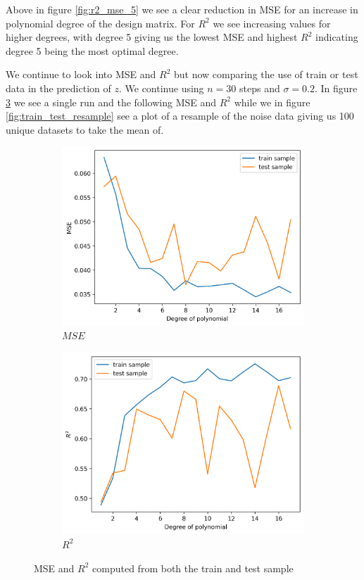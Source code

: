 \documentclass[12pt]{article}
\begin{document}
Above in figure \ref{fig:r2_mse_5} we see a clear reduction in MSE for an increase in polynomial degree of the design matrix. For $R^2$ we see increasing values for higher degrees, with degree 5 giving us the lowest MSE and highest $R^2$ indicating degree 5 being the most optimal degree.

We continue to look into MSE and $R^2$ but now comparing the use of train or test data in the prediction of $z$. We continue using $n=30$ steps and $\sigma=0.2$. In figure \ref{fig:train_test} we see a single run and the following MSE and $R^2$ while we in figure \ref{fig:train_test_resample} see a plot of a resample of the noise data giving us 100 unique datasets to take the mean of.
\begin{figure}[H]
  \begin{subfigure}{.5\textwidth}
    \centering
    \includegraphics[width=\textwidth]{../figures/mse_train_test.png}
    \caption{$MSE$}
    \label{fig:}
  \end{subfigure}
  \begin{subfigure}{.5\textwidth}
    \centering
    \includegraphics[width=\textwidth]{../figures/r2_train_test.png}
    \caption{$R^2$}
    \label{fig:}
  \end{subfigure}
  \caption{MSE and $R^2$ computed from both the train and test sample}
  \label{fig:train_test}
\end{figure}
\end{document}
